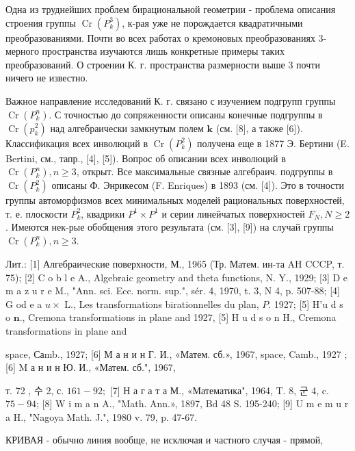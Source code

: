 \documentclass[10pt]{article}
\begin{document}
Одна из труднейших проблем бирациональной геометрии - проблема описания строения группы $\operatorname{Cr}\left(P_{k}^{3}\right)$, к-рая уже не порождается квадратичными преобразованиями. Почти во всех работах о кремоновых преобразованиях 3-мерного пространства изучаются лишь конкретные примеры таких преобразований. О строении К. г. пространства размерности выше 3 почти ничего не известно.



Важное направление исследований К. г. связано с изучением подгрупп группы $\operatorname{Cr}\left(P_{k}^{n}\right)$. С точностью до сопряженности описаны конечные подгруппы в $\operatorname{Cr}\left(p_{k}^{2}\right)$ над алгебраически замкнутым полем $\boldsymbol{k}$ (см. [8], а также [6]). Классификация всех инволюций в $\operatorname{Cr}\left(P_{k}^{2}\right)$ получена еще в 1877 Э. Бертини (E. Bertini, см., тапр., [4], [5]). Вопрос об описании всех инволюций в $\operatorname{Cr}\left(P_{k}^{n}\right), n \geqslant 3$, открыт. Все максимальные связные алгебраич. подгруппы в $\operatorname{Cr}\left(P_{k}^{2}\right)$ описаны Ф. Энрикесом (F. Enriques) в 1893 (см. [4]). Это в точности группы автоморфизмов всех минимальных моделей рациональных поверхностей, т. е. плоскости $P_{k}^{2}$, квадрики $P^{1} \times P^{1}$ и серии линейчатых поверхностей $F_{N}, N \geqslant 2$. Имеются нек-рые обобщения этого результата (см. [3], [9]) на случай группы $\operatorname{Cr}\left(P_{k}^{n}\right), n \geqslant 3$.



Лит.: [1] Алгебраические поверхности, М., 1965 (Тр. Матем. ин-та AH CCCP, т. 75); [2] C o b l e A., Algebraic geometry and theta functions, N. Y., 1929; [3] D e m a z u r e M., "Ann. sci. Ecc. norm. sup.", sér. 4, 1970, t. 3, N 4, p. 507-88; [4] G od e a $u \times$ L., Les transformations birationnelles du plan, $P$. 1927; [5] H'u d s o $\mathbf{n}$., Cremona transformations in plane and 1927, [5] H u d s o n H., Cremona transformations in plane and

space, Саmb., 1927; [6] М а н и н Г. И., «Матем. сб.», 1967, space, Camb., 1927 ; [6] M а н и н Ю. И., «Матем. сб.", 1967,

т. 72 , 수 2, с. $161-92 ;$ [7] Н а г а т а М., «Математика", 1964, T. 8, 군 4, c. $75-94$; [8] W i m a n A., "Math. Ann.», 1897, Bd 48 S. 195-240; [9] U m e m u r a H., "Nagoya Math. J.", 1980 v. 79, p. 47-67.



КРИВАЯ - обычно линия вообще, не исключая и частного случая - прямой,
\end{document}
